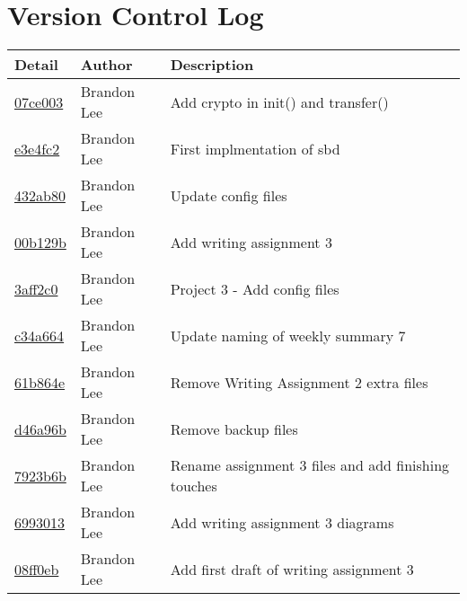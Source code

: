 \documentclass[letterpaper,10pt,titlepage]{article}
\begin{document}
\section{Version Control Log}

\begin{tabular}{l l l}\textbf{Detail} & \textbf{Author} & \textbf{Description}\\\hline
\href{https://github.com/brandonlee503/Operating-Systems-II/commit/07ce00358a3c43cccb0873bc728f0b3dcdc5c0d7}{07ce003} & Brandon Lee & Add crypto in init() and transfer()\\\hline
\href{https://github.com/brandonlee503/Operating-Systems-II/commit/e3e4fc2d9bf79904ee2e2713e35c1f0db0d3cc80}{e3e4fc2} & Brandon Lee & First implmentation of sbd\\\hline
\href{https://github.com/brandonlee503/Operating-Systems-II/commit/432ab809f9796c4299c9d8988631461690037695}{432ab80} & Brandon Lee & Update config files\\\hline
\href{https://github.com/brandonlee503/Operating-Systems-II/commit/00b129b18f87d1ae6f1723f572e346d5a054f4e5}{00b129b} & Brandon Lee & Add writing assignment 3\\\hline
\href{https://github.com/brandonlee503/Operating-Systems-II/commit/3aff2c0cfc92a7d66fefb1f1fd3da2d4eb8e9f55}{3aff2c0} & Brandon Lee & Project 3 - Add config files\\\hline
\href{https://github.com/brandonlee503/Operating-Systems-II/commit/c34a6641307a82ff7e3a75b7ab352220d4cdde54}{c34a664} & Brandon Lee & Update naming of weekly summary 7\\\hline
\href{https://github.com/brandonlee503/Operating-Systems-II/commit/61b864eaea9f86247f5a478701335d0b9627bac1}{61b864e} & Brandon Lee & Remove Writing Assignment 2 extra files\\\hline
\href{https://github.com/brandonlee503/Operating-Systems-II/commit/d46a96bd2dcbf9fdae60d025b9b393fd583bdc79}{d46a96b} & Brandon Lee & Remove backup files\\\hline
\href{https://github.com/brandonlee503/Operating-Systems-II/commit/7923b6b7bf425b6f5cd26c8689676398f2b50636}{7923b6b} & Brandon Lee & Rename assignment 3 files and add finishing touches\\\hline
\href{https://github.com/brandonlee503/Operating-Systems-II/commit/69930131ebfccea311bd636268993ad0f9b88f2a}{6993013} & Brandon Lee & Add writing assignment 3 diagrams\\\hline
\href{https://github.com/brandonlee503/Operating-Systems-II/commit/08ff0eb46768dc2293c526f8126070a51a7fbb7b}{08ff0eb} & Brandon Lee & Add first draft of writing assignment 3\\\hline

\end{tabular}
\end{document}
